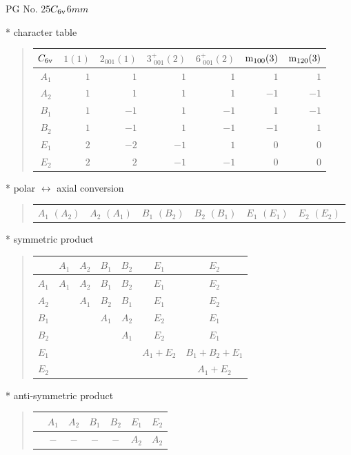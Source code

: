 \documentclass[fleqn,8pt,landscape]{jsarticle}
\begin{document}
\setcounter{MaxMatrixCols}{32}

\renewcommand{\tablename}{Table~}
\renewcommand{\figurename}{Figure~}
\begin{center}
\LARGE
PG No. 25\quad$C_{\rm 6v}$\quad$6mm$\quad[ hexagonal ]
\end{center}

* character table
\begin{quote}
\begin{tabular}{crrrrrr} \hline \hline
$ C_{\rm 6v} $ & $ 1(1) $ & $ 2{}_{001}(1) $ & $ 3^{+}_{\,\,001}(2) $ & $ 6^{+}_{\,\,001}(2) $ & $ {\rm m}_{100}(3) $ & $ {\rm m}_{120}(3) $ \\ \hline
$ A_{1} $ & $ 1 $ & $ 1 $ & $ 1 $ & $ 1 $ & $ 1 $ & $ 1 $ \\
$ A_{2} $ & $ 1 $ & $ 1 $ & $ 1 $ & $ 1 $ & $ -1 $ & $ -1 $ \\
$ B_{1} $ & $ 1 $ & $ -1 $ & $ 1 $ & $ -1 $ & $ 1 $ & $ -1 $ \\
$ B_{2} $ & $ 1 $ & $ -1 $ & $ 1 $ & $ -1 $ & $ -1 $ & $ 1 $ \\
$ E_{1} $ & $ 2 $ & $ -2 $ & $ -1 $ & $ 1 $ & $ 0 $ & $ 0 $ \\
$ E_{2} $ & $ 2 $ & $ 2 $ & $ -1 $ & $ -1 $ & $ 0 $ & $ 0 $ \\
 \hline \hline
\end{tabular}
\end{quote}

* polar $\leftrightarrow$ axial conversion
\begin{quote}
\begin{tabular}{cccccc}
$ A_{1}\,\,(A_{2}) $ & $ A_{2}\,\,(A_{1}) $ & $ B_{1}\,\,(B_{2}) $ & $ B_{2}\,\,(B_{1}) $ & $ E_{1}\,\,(E_{1}) $ & $ E_{2}\,\,(E_{2}) $
\end{tabular}
\end{quote}

* symmetric product
\begin{quote}
\begin{tabular}{c|cccccc} \hline \hline
 & $ A_{1} $ & $ A_{2} $ & $ B_{1} $ & $ B_{2} $ & $ E_{1} $ & $ E_{2} $ \\ \hline
$ A_{1} $ & $ A_{1} $ & $ A_{2} $ & $ B_{1} $ & $ B_{2} $ & $ E_{1} $ & $ E_{2} $ \\
$ A_{2} $ & $  $ & $ A_{1} $ & $ B_{2} $ & $ B_{1} $ & $ E_{1} $ & $ E_{2} $ \\
$ B_{1} $ & $  $ & $  $ & $ A_{1} $ & $ A_{2} $ & $ E_{2} $ & $ E_{1} $ \\
$ B_{2} $ & $  $ & $  $ & $  $ & $ A_{1} $ & $ E_{2} $ & $ E_{1} $ \\
$ E_{1} $ & $  $ & $  $ & $  $ & $  $ & $ A_{1} + E_{2} $ & $ B_{1} + B_{2} + E_{1} $ \\
$ E_{2} $ & $  $ & $  $ & $  $ & $  $ & $  $ & $ A_{1} + E_{2} $ \\
 \hline \hline
\end{tabular}
\end{quote}

* anti-symmetric product
\begin{quote}
\begin{tabular}{ccccccc} \hline \hline
 & $ A_{1} $ & $ A_{2} $ & $ B_{1} $ & $ B_{2} $ & $ E_{1} $ & $ E_{2} $ \\ \hline
$  $ & $ - $ & $ - $ & $ - $ & $ - $ & $ A_{2} $ & $ A_{2} $ \\
 \hline \hline
\end{tabular}
\end{quote}
\end{document}
